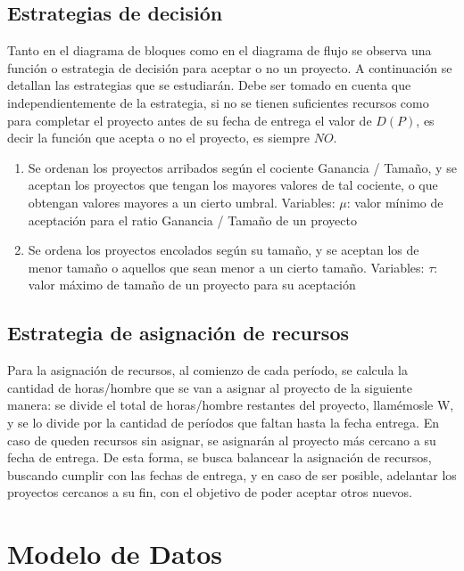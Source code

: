 \documentclass[a4paper,10pt]{article}
\begin{document}
\subsection{Estrategias de decisión}

Tanto en el diagrama de bloques como en el diagrama de flujo se observa una función o estrategia de decisión para aceptar o no un proyecto. A continuación se detallan 
las estrategias que se estudiarán. Debe ser tomado en cuenta que independientemente de la estrategia, si no se tienen suficientes recursos como para completar el proyecto 
antes de su fecha de entrega el valor de $D(P)$, es decir la función que acepta o no el proyecto, es siempre $NO$.

\begin{enumerate}
    \item Se ordenan los proyectos arribados según el cociente Ganancia / Tamaño, y se aceptan los proyectos que tengan los mayores valores de tal cociente,
 o que obtengan valores mayores a un cierto umbral.
    Variables: $\mu$: valor mínimo de aceptación para el ratio Ganancia / Tamaño de un proyecto

    \item Se ordena los proyectos encolados según su tamaño, y se aceptan los de menor tamaño o aquellos que sean menor a un cierto tamaño. 
    Variables: $\tau$: valor máximo de tamaño de un proyecto para su aceptación

\end{enumerate}

\subsection{Estrategia de asignación de recursos}

Para la asignación de recursos, al comienzo de cada período, se calcula la cantidad de horas/hombre que se van a asignar al proyecto de la siguiente manera: 
se divide el total de horas/hombre restantes del proyecto, llamémosle W, y se lo divide por la 
cantidad de períodos que faltan hasta la fecha entrega. En caso de queden recursos sin asignar, se asignarán al proyecto más cercano a su fecha de entrega. 
De esta forma, se busca balancear la asignación de recursos, buscando cumplir con las fechas de entrega, y en caso de ser posible, adelantar los proyectos 
cercanos a su fin, con el objetivo de poder aceptar otros nuevos.

\section{Modelo de Datos}
\end{document}
